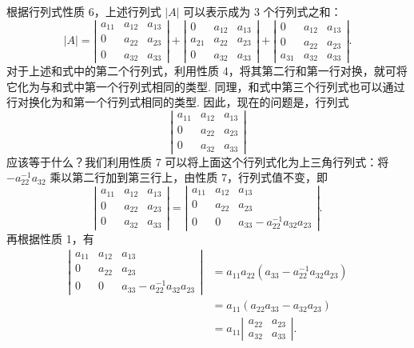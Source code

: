 \documentclass[UTF8,12pt,a4paper,fontset=fandol]{ctexart}
\begin{document}
根据行列式性质 6，上述行列式 $|A|$ 可以表示成为 3 个行列式之和：
\[
|A|=
\left|\begin{array}{ccc}
a_{11} & a_{12} & a_{13}\\
0 & a_{22} & a_{23}\\
0 & a_{32} & a_{33}
\end{array}\right|
+
\left|\begin{array}{ccc}
0 & a_{12} & a_{13}\\
a_{21} & a_{22} & a_{23}\\
0 & a_{32} & a_{33}
\end{array}\right|
+
\left|\begin{array}{ccc}
0 & a_{12} & a_{13}\\
0 & a_{22} & a_{23}\\
a_{31} & a_{32} & a_{33}
\end{array}\right|.
\]
对于上述和式中的第二个行列式，利用性质 4，将其第二行和第一行对换，就可将它化为与和式中第一个行列式相同的类型. 同理，和式中第三个行列式也可以通过行对换化为和第一个行列式相同的类型. 因此，现在的问题是，行列式
\[
\left|\begin{array}{ccc}
a_{11} & a_{12} & a_{13}\\
0 & a_{22} & a_{23}\\
0 & a_{32} & a_{33}
\end{array}\right|
\]
应该等于什么？我们利用性质 7 可以将上面这个行列式化为上三角行列式：将 $-a_{22}^{-1}a_{32}$ 乘以第二行加到第三行上，由性质 7，行列式值不变，即
\[
\left|\begin{array}{ccc}
a_{11} & a_{12} & a_{13}\\
0 & a_{22} & a_{23}\\
0 & a_{32} & a_{33}
\end{array}\right|
=
\left|\begin{array}{ccc}
a_{11} & a_{12} & a_{13}\\
0 & a_{22} & a_{23}\\
0 & 0 & a_{33}-a_{22}^{-1}a_{32}a_{23}
\end{array}\right|.
\]
再根据性质 1，有
\[
\begin{aligned}
\left|\begin{array}{ccc}
a_{11} & a_{12} & a_{13}\\
0 & a_{22} & a_{23}\\
0 & 0 & a_{33}-a_{22}^{-1}a_{32}a_{23}
\end{array}\right|
&=a_{11}a_{22}(a_{33}-a_{22}^{-1}a_{32}a_{23})\\
&=a_{11}(a_{22}a_{33}-a_{32}a_{23})\\
&=a_{11}
\left|\begin{array}{cc}
a_{22} & a_{23}\\
a_{32} & a_{33}
\end{array}\right|.
\end{aligned}
\]
\end{document}
